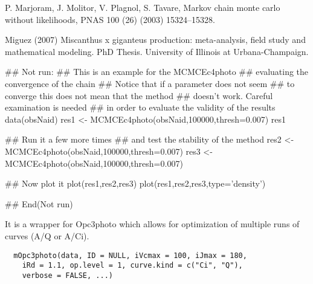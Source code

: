 \documentclass[letterpaper]{book}
\begin{document}
%
\begin{References}\relax
P. Marjoram, J. Molitor, V. Plagnol, S. Tavare, Markov
chain monte carlo without likelihoods, PNAS 100 (26)
(2003) 15324--15328.

Miguez (2007) Miscanthus x giganteus production:
meta-analysis, field study and mathematical modeling. PhD
Thesis. University of Illinois at Urbana-Champaign.
\end{References}
%
\begin{Examples}
\begin{ExampleCode}
## Not run: 
## This is an example for the MCMCEc4photo
## evaluating the convergence of the chain
## Notice that if a parameter does not seem
## to converge this does not mean that the method
## doesn't work. Careful examination is needed
## in order to evaluate the validity of the results
data(obsNaid)
res1 <- MCMCEc4photo(obsNaid,100000,thresh=0.007)
res1

## Run it a few more times
## and test the stability of the method
res2 <- MCMCEc4photo(obsNaid,100000,thresh=0.007)
res3 <- MCMCEc4photo(obsNaid,100000,thresh=0.007)

## Now plot it
plot(res1,res2,res3)
plot(res1,res2,res3,type='density')

## End(Not run)
\end{ExampleCode}
\end{Examples}
%
\begin{Description}\relax
It is a wrapper for Opc3photo which allows for
optimization of multiple runs of curves (A/Q or A/Ci).
\end{Description}
%
\begin{Usage}
\begin{verbatim}
  mOpc3photo(data, ID = NULL, iVcmax = 100, iJmax = 180,
    iRd = 1.1, op.level = 1, curve.kind = c("Ci", "Q"),
    verbose = FALSE, ...)
\end{verbatim}
\end{Usage}
%
\end{document}
